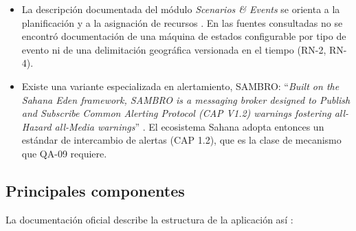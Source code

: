 \documentclass[11pt,letterpaper]{article}
\begin{document}
\begin{itemize}
  \item La descripción documentada del módulo \emph{Scenarios \& Events} se orienta a la
        planificación y a la asignación de recursos \cite{sahana-eden-legacy}. En las fuentes
        consultadas no se encontró documentación de una máquina de estados configurable por tipo de
        evento ni de una delimitación geográfica versionada en el tiempo (RN-2, RN-4).
  \item Existe una variante especializada en alertamiento, SAMBRO: \enquote{\emph{Built on the
        Sahana Eden framework, SAMBRO is a messaging broker designed to Publish and Subscribe Common
        Alerting Protocol (CAP V1.2) warnings fostering all-Hazard all-Media warnings}}
        \cite{sambro}. El ecosistema Sahana adopta entonces un estándar de intercambio de alertas
        (CAP 1.2), que es la clase de mecanismo que QA-09 requiere.
\end{itemize}

\subsection{Principales componentes}

La documentación oficial describe la estructura de la aplicación así \cite{eden-basics}:
\end{document}
